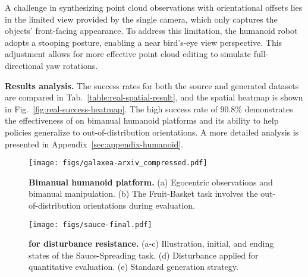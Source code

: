 A challenge in synthesizing point cloud observations with orientational offsets lies in the limited view provided by the single camera, which only captures the objects' front-facing appearance. To address this limitation, the humanoid robot adopts a stooping posture, enabling a near bird’s-eye view perspective. This adjustment allows for more effective point cloud editing to simulate full-directional yaw rotations.



\vspace{0.2cm} \noindent\textbf{Results analysis.} 
The success rates for both the source and generated datasets are compared in Tab.~\ref{table:real-spatial-result}, and the spatial heatmap is shown in Fig.~\ref{fig:real-success-heatmap}. The high success rate of $90.8\%$ demonstrates the effectiveness of \method on bimanual humanoid platforms and its ability to help policies generalize to out-of-distribution orientations. 
A more detailed analysis is presented in Appendix~\ref{sec:appendix-humanoid}.





\begin{figure}
    \centering
    \texttt{[image: figs/galaxea-arxiv\_compressed.pdf]}
    \caption{\textbf{Bimanual humanoid platform.} (a) Egocentric observations and bimanual manipulation. (b) The Fruit-Basket task involves the out-of-distribution orientations during evaluation.}
    \label{fig:real-humanoid}
    \vspace{-0.3cm}
\end{figure}




\begin{figure}[bp]
    \centering
    \vspace{-0.2cm}
    \texttt{[image: figs/sauce-final.pdf]}
    \caption{\textbf{\method for disturbance resistance.} (a-c) Illustration, initial, and ending states of the Sauce-Spreading task. (d) Disturbance applied for quantitative evaluation. (e) Standard generation strategy. }
    \label{fig:real-sauce-setup}
\end{figure}



